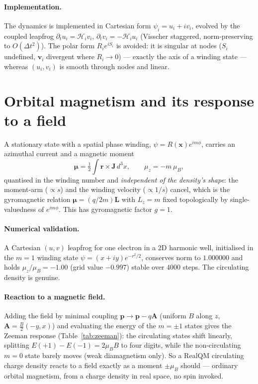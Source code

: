 \documentclass[11pt]{article}
\begin{document}
\paragraph{Implementation.} The dynamics is implemented in Cartesian form $\psi_i=u_i+iv_i$, evolved by
the coupled leapfrog $\partial_t u_i=\mathcal H_i v_i$, $\partial_t v_i=-\mathcal H_i u_i$ (Visscher
staggered, norm-preserving to $O(\Delta t^2)$). The polar form $R_i e^{iS_i}$ is avoided: it is singular
at nodes ($S_i$ undefined, $\mathbf v_i$ divergent where $R_i\to0$) --- exactly the axis of a winding
state --- whereas $(u_i,v_i)$ is smooth through nodes and linear.

\section{Orbital magnetism and its response to a field}
\label{sec:orbital}

A stationary state with a spatial phase winding, $\psi=R(\mathbf x)e^{im\phi}$, carries an azimuthal
current and a magnetic moment
\begin{equation}
\boldsymbol\mu=\tfrac12\!\int\mathbf r\times\mathbf J\,d^3x,\qquad \mu_z=-m\,\mu_B,
\label{eq:mu}
\end{equation}
quantised in the winding number and \emph{independent of the density's shape}: the moment-arm ($\propto s$)
and the winding velocity ($\propto 1/s$) cancel, which is the gyromagnetic relation
$\boldsymbol\mu=(q/2m)\mathbf L$ with $L_z=m$ fixed topologically by single-valuedness of $e^{im\phi}$.
This has gyromagnetic factor $g=1$.

\paragraph{Numerical validation.} A Cartesian $(u,v)$ leapfrog for one electron in a 2D harmonic well,
initialised in the $m=1$ winding state $\psi=(x+iy)e^{-r^2/2}$, conserves norm to $1.000000$ and holds
$\mu_z/\mu_B=-1.00$ (grid value $-0.997$) stable over $4000$ steps. The circulating density is genuine.

\paragraph{Reaction to a magnetic field.} Adding the field by minimal coupling
$\mathbf p\to\mathbf p-q\mathbf A$ (uniform $B$ along $z$, $\mathbf A=\tfrac{B}{2}(-y,x)$) and evaluating
the energy of the $m=\pm1$ states gives the Zeeman response (Table~\ref{tab:zeeman}): the circulating
states shift linearly, splitting $E(+1)-E(-1)=2\mu_B B$ to four digits, while the non-circulating $m=0$
state barely moves (weak diamagnetism only). So a RealQM circulating charge density reacts to a field
exactly as a moment $\pm\mu_B$ should --- ordinary orbital magnetism, from a charge density in real space,
no spin invoked.
\end{document}

